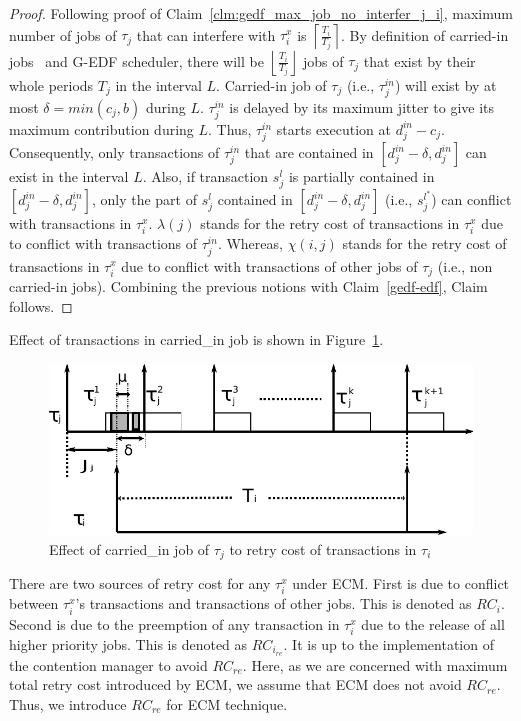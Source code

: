 \begin{proof}
%
Following proof of Claim~\ref{clm:gedf_max_job_no_interfer_j_i},
maximum number of jobs of $\tau_{j}$ that can interfere with $\tau_{i}^{x}$
is $\left\lceil\frac{T_{i}}{T_{j}}\right\rceil$. By definition of
carried-in jobs~\cite{key-2} and G-EDF scheduler, there will be $\left\lfloor\frac{T_{i}}{T_{j}}\right\rfloor$
jobs of $\tau_{j}$ that exist by their whole periods $T_{j}$
in the interval $L$. Carried-in job of $\tau_{j}$ (i.e., $\tau_{j}^{in}$)
will exist by at most $\delta=min\left(c_{j},b\right)$ during
$L$. $\tau_{j}^{in}$ is delayed by its maximum jitter to give its
maximum contribution during $L$. Thus, $\tau_{j}^{in}$ starts execution
at $d_{j}^{in}-c_{j}$. Consequently, only transactions of $\tau_{j}^{in}$
that are contained in $\left[d_{j}^{in}-\delta,d_{j}^{in}\right]$
can exist in the interval $L$. Also, if transaction $s_{j}^{l}$
is partially contained in $\left[d_{j}^{in}-\delta,d_{j}^{in}\right]$,
only the part of $s_{j}^{l}$ contained in $\left[d_{j}^{in}-\delta,d_{j}^{in}\right]$
(i.e., $s_{j}^{l^{*}}$) can conflict with transactions in $\tau_{i}^{x}$.
$\lambda(j)$ stands for the retry cost of transactions in $\tau_{i}^{x}$
due to conflict with transactions of $\tau_{j}^{in}$. Whereas, $\chi(i,j)$
stands for the retry cost of transactions in $\tau_{i}^{x}$ due to
conflict with transactions of other jobs of $\tau_{j}$ (i.e., non
carried-in jobs). Combining the previous notions with Claim~\ref{gedf-edf},
Claim follows.
%
\end{proof}
%
Effect of transactions in carried\_in job is shown in Figure~\ref{fig10}.
%
\begin{figure}
\centering{}\includegraphics[scale=0.5]{figures/figure10}\caption{\label{fig10}Effect of carried\_in job of $\tau_j$ to retry cost of transactions in $\tau_i$}
\end{figure}
%
There are two sources of retry cost for any $\tau_i^x$ under ECM. First is due to conflict between $\tau_i^x$'s transactions and transactions of other jobs. This is denoted as $RC_i$. Second is due to the preemption of any transaction in $\tau_i^x$ due to the release of all higher priority jobs. This is denoted as $RC_{i_{re}}$. It is up to the implementation  of the contention manager to avoid $RC_{re}$. Here, as we are concerned with maximum total retry cost introduced by ECM, we assume that ECM does not avoid $RC_{re}$. Thus, we introduce $RC_{re}$ for ECM technique.
